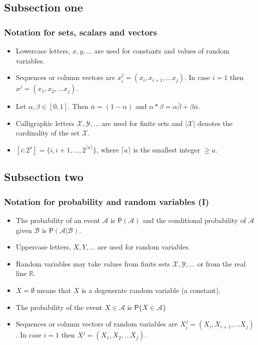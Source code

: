 \documentclass{beamer}
\begin{document}
\subsection{Subsection one}
\begin{frame}
\frametitle{Notation for sets, scalars and vectors}
\begin{itemize}
\item Lowercase letters, $x,y,...$ are used for constants and values of random variables. \item Sequences or column vectors are $x_i^j=(x_i, x_{i+1}, ...x_j)$. In case $i=1$ then $x^j=(x_1, x_2, ...x_j)$.
\item Let $\alpha, \beta \in [0,1]$. Then $\bar{\alpha}=(1-\alpha)$ and $\alpha * \beta = \alpha \bar{\beta}+\beta \bar{\alpha}$.
\item Calligraphic letters $\mathcal{X,Y, ...}$ are used for finite sets and $|\mathcal{X}|$ denotes the cardinality of the set $\mathcal{X}$.
\item $[i:2^a]=\{i, i+1, ..., 2^{\lceil{a}\rceil}\}$, where $\lceil{a}\rceil$ is the smallest integer $\geq a$.
\end{itemize}
\end{frame}


\subsection{Subsection two}
\begin{frame}
\frametitle{Notation for probability and random variables (I)}
\begin{itemize}
\item The probability of an event $\mathcal A$ is $\mathsf P(\mathcal A)$ and the conditional probability of $\mathcal A$ given $\mathcal B$ is $\mathsf P(\mathcal A|\mathcal B)$.
\item Uppercase letters, $X,Y,...$ are used for random variables.
\item Random variables may take values from finite sets $\mathcal{X,Y, ...}$ or from the real line $\mathbb R$.
\item $X=\emptyset$ means that $X$ is a degenerate random variable (a constant).
\item The probability of the event $X\in \mathcal A$ is $\mathsf P\{X\in \mathcal A\}$
\item Sequences or column vectors of random variables are $X_i^j=(X_i, X_{i+1}, ...X_j)$. In case $i=1$ then $X^j=(X_1, X_2, ...X_j)$.
\end{itemize}
\end{frame}
\end{document}
